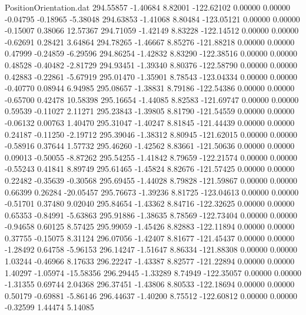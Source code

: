 \begin{filecontents}{PositionOrientation.dat}
 294.55857   -1.40684    8.82001  -122.62102    0.00000    0.00000   -0.04795   -0.18965   -5.38048
 294.63853   -1.41068    8.80484  -123.05121    0.00000    0.00000   -0.15007    0.38066   12.57367
 294.71059   -1.42149    8.83228  -122.14512    0.00000    0.00000   -0.62691    0.28421    3.64864
 294.78265   -1.46667    8.85276  -121.88218    0.00000    0.00000    0.47999   -0.24859   -6.29596
 294.86254   -1.42832    8.83290  -122.38516    0.00000    0.00000    0.48528   -0.40482   -2.81729
 294.93451   -1.39340    8.80376  -122.58790    0.00000    0.00000    0.42883   -0.22861   -5.67919
 295.01470   -1.35901    8.78543  -123.04334    0.00000    0.00000   -0.40770    0.08944    6.94985
 295.08657   -1.38831    8.79186  -122.54386    0.00000    0.00000   -0.65700    0.42478   10.58398
 295.16654   -1.44085    8.82583  -121.69747    0.00000    0.00000    0.59539   -0.11027    2.11271
 295.23843   -1.39805    8.81790  -121.54559    0.00000    0.00000   -0.06132    0.00763    1.40470
 295.31047   -1.40247    8.81845  -121.44439    0.00000    0.00000    0.24187   -0.11250   -2.19712
 295.39046   -1.38312    8.80945  -121.62015    0.00000    0.00000   -0.58916    0.37644    1.57732
 295.46260   -1.42562    8.83661  -121.50636    0.00000    0.00000    0.09013   -0.50055   -8.87262
 295.54255   -1.41842    8.79659  -122.21574    0.00000    0.00000   -0.55243    0.41841    8.89749
 295.61465   -1.45824    8.82676  -121.57425    0.00000    0.00000    0.22482   -0.35639   -0.30568
 295.69455   -1.44028    8.79828  -121.59867    0.00000    0.00000    0.66399    0.26284  -20.05457
 295.76673   -1.39236    8.81725  -123.04613    0.00000    0.00000   -0.51701    0.37480    9.02040
 295.84654   -1.43362    8.84716  -122.32625    0.00000    0.00000    0.65353   -0.84991   -5.63863
 295.91886   -1.38635    8.78569  -122.73404    0.00000    0.00000   -0.94658    0.60125    8.57425
 295.99059   -1.45426    8.82883  -122.11894    0.00000    0.00000    0.37755   -0.15075    8.31124
 296.07056   -1.42407    8.81677  -121.45437    0.00000    0.00000   -1.28492    0.64758   -5.96153
 296.14247   -1.51647    8.86334  -121.88308    0.00000    0.00000    1.03244   -0.46966    8.17633
 296.22247   -1.43387    8.82577  -121.22894    0.00000    0.00000    1.40297   -1.05974  -15.58356
 296.29445   -1.33289    8.74949  -122.35057    0.00000    0.00000   -1.31355    0.69744    2.04368
 296.37451   -1.43806    8.80533  -122.18694    0.00000    0.00000    0.50179   -0.69881   -5.86146
 296.44637   -1.40200    8.75512  -122.60812    0.00000    0.00000   -0.32599    1.44474    5.14085

\end{filecontents}
